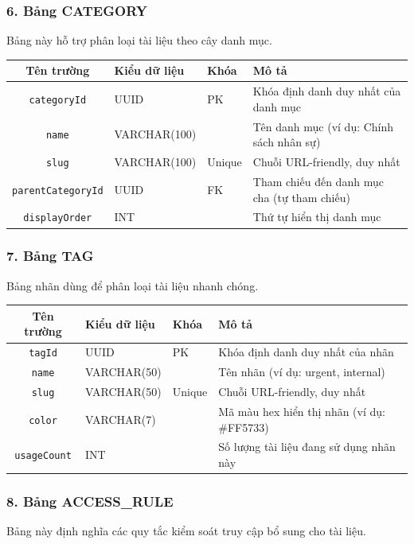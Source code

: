 \documentclass[12pt,a4paper]{report}
\begin{document}
\subsubsection{6. Bảng CATEGORY}
Bảng này hỗ trợ phân loại tài liệu theo cây danh mục.

\begin{table}[H]
\centering
\begin{tabularx}{\textwidth}{|c|l|l|X|}
\hline
\rowcolor{gray!10}
Tên trường & Kiểu dữ liệu & Khóa & Mô tả \\ \hline
\texttt{categoryId} & UUID & PK & Khóa định danh duy nhất của danh mục \\ \hline
\texttt{name} & VARCHAR(100) &  & Tên danh mục (ví dụ: Chính sách nhân sự) \\ \hline
\texttt{slug} & VARCHAR(100) & Unique & Chuỗi URL-friendly, duy nhất \\ \hline
\texttt{parentCategoryId} & UUID & FK & Tham chiếu đến danh mục cha (tự tham chiếu) \\ \hline
\texttt{displayOrder} & INT &  & Thứ tự hiển thị danh mục \\ \hline
\end{tabularx}
\end{table}

\subsubsection{7. Bảng TAG}
Bảng nhãn dùng để phân loại tài liệu nhanh chóng.

\begin{table}[H]
\centering
\begin{tabularx}{\textwidth}{|c|l|l|X|}
\hline
\rowcolor{gray!10}
Tên trường & Kiểu dữ liệu & Khóa & Mô tả \\ \hline
\texttt{tagId} & UUID & PK & Khóa định danh duy nhất của nhãn \\ \hline
\texttt{name} & VARCHAR(50) &  & Tên nhãn (ví dụ: urgent, internal) \\ \hline
\texttt{slug} & VARCHAR(50) & Unique & Chuỗi URL-friendly, duy nhất \\ \hline
\texttt{color} & VARCHAR(7) &  & Mã màu hex hiển thị nhãn (ví dụ: \#FF5733) \\ \hline
\texttt{usageCount} & INT &  & Số lượng tài liệu đang sử dụng nhãn này \\ \hline
\end{tabularx}
\end{table}

\subsubsection{8. Bảng ACCESS\_RULE}
Bảng này định nghĩa các quy tắc kiểm soát truy cập bổ sung cho tài liệu.
\end{document}
